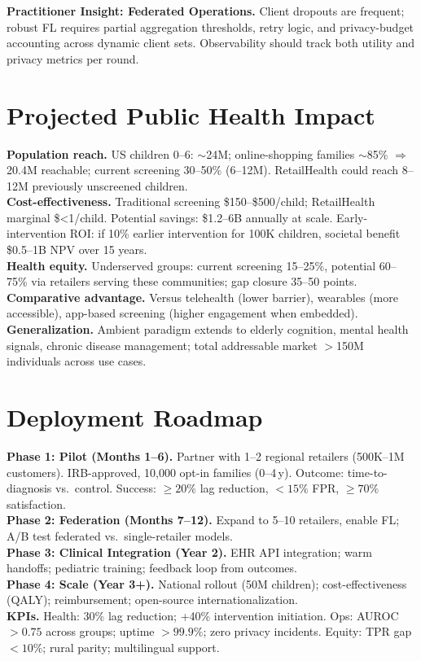 \documentclass[conference]{IEEEtran}
\theoremstyle{plain}
\theoremstyle{remark}
\begin{document}
\begin{mdframed}
\textbf{Practitioner Insight: Federated Operations.} Client dropouts are frequent; robust FL requires partial aggregation thresholds, retry logic, and privacy-budget accounting across dynamic client sets. Observability should track both utility and privacy metrics per round.
\end{mdframed}

\section{Projected Public Health Impact}\label{sec:phi}
\textbf{Population reach.} US children 0--6: $\sim$24M; online-shopping families $\sim$85\% $\Rightarrow$ 20.4M reachable; current screening 30--50\% (6--12M). RetailHealth could reach 8--12M previously unscreened children.\\
\textbf{Cost-effectiveness.} Traditional screening \$150--\$500/child; RetailHealth marginal \$<1/child. Potential savings: \$1.2--6B annually at scale. Early-intervention ROI: if 10\% earlier intervention for 100K children, societal benefit \$0.5--1B NPV over 15 years.\\
\textbf{Health equity.} Underserved groups: current screening 15--25\%, potential 60--75\% via retailers serving these communities; gap closure 35--50 points.\\
\textbf{Comparative advantage.} Versus telehealth (lower barrier), wearables (more accessible), app-based screening (higher engagement when embedded).\\
\textbf{Generalization.} Ambient paradigm extends to elderly cognition, mental health signals, chronic disease management; total addressable market $>$150M individuals across use cases.
\section{Deployment Roadmap}\label{sec:roadmap}
\textbf{Phase 1: Pilot (Months 1--6).} Partner with 1--2 regional retailers (500K--1M customers). IRB-approved, 10{,}000 opt-in families (0--4\,y). Outcome: time-to-diagnosis vs.\ control. Success: $\ge 20\%$ lag reduction, ${<}15\%$ FPR, $\ge 70\%$ satisfaction.\\
\textbf{Phase 2: Federation (Months 7--12).} Expand to 5--10 retailers, enable FL; A/B test federated vs.\ single-retailer models.\\
\textbf{Phase 3: Clinical Integration (Year 2).} EHR API integration; warm handoffs; pediatric training; feedback loop from outcomes.\\
\textbf{Phase 4: Scale (Year 3+).} National rollout (50M children); cost-effectiveness (QALY); reimbursement; open-source internationalization.\\
\textbf{KPIs.} Health: 30\% lag reduction; +40\% intervention initiation. Ops: AUROC $>0.75$ across groups; uptime $>99.9\%$; zero privacy incidents. Equity: TPR gap ${<}10\%$; rural parity; multilingual support.
\end{document}
